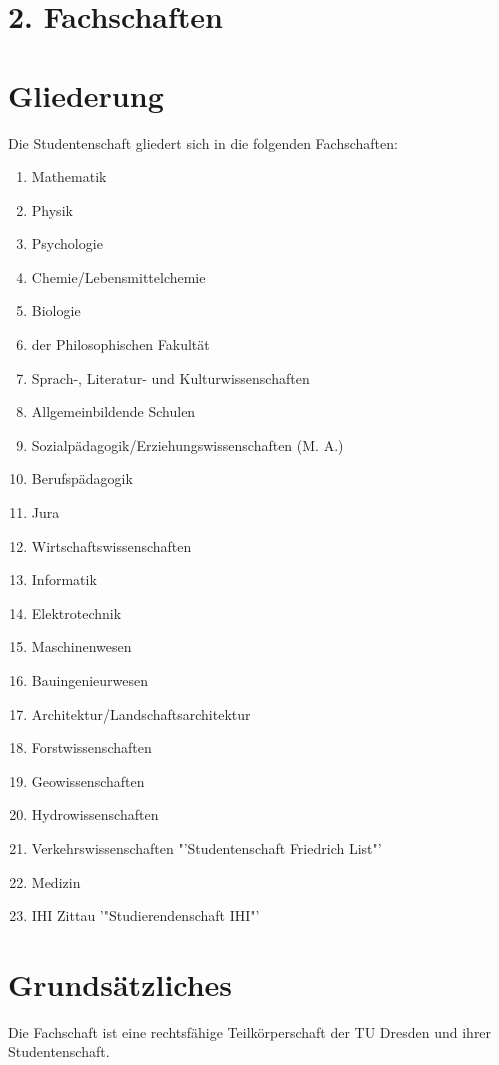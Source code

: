 \begin{multicols}{2}
\section*{2. Fachschaften}



\section{Gliederung}

\Abs \Satz Die Studentenschaft gliedert sich in die folgenden Fachschaften:
\begin{enumerate}
\item Mathematik
\item Physik
\item Psychologie
\item Chemie/Lebensmittelchemie
\item Biologie
\item der Philosophischen Fakultät
\item Sprach-, Literatur- und Kulturwissenschaften
\item Allgemeinbildende Schulen
\item Sozialpädagogik/Erziehungswissenschaften (M. A.)
\item Berufspädagogik
\item Jura
\item Wirtschaftswissenschaften
\item Informatik
\item Elektrotechnik
\item Maschinenwesen
\item Bauingenieurwesen
\item Architektur/Landschaftsarchitektur
\item Forstwissenschaften
\item Geowissenschaften
\item Hydrowissenschaften
\item Verkehrswissenschaften "'Studentenschaft Friedrich List"'
\item Medizin
\item IHI Zittau '"Studierendenschaft IHI"'
\end{enumerate}



\section{Grundsätzliches}

\Abs \Satz Die Fachschaft ist eine rechtsfähige Teilkörperschaft der TU Dresden und ihrer Studentenschaft.


\end{multicols}
